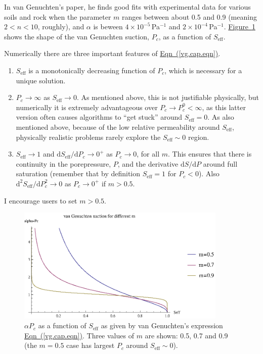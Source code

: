 \documentclass[12pt]{report}
\begin{document}
In van Genuchten's paper, he finds good fits with experimental data
for various soils and rock when the parameter $m$ ranges between about
0.5 and 0.9 (meaning $2<n<10$, roughly), and $\alpha$ is beween
$4\times 10^{-5}$\,Pa$^{-1}$ and $2\times 10^{-4}$\,Pa$^{-1}$.
\hyperref[van_genuchten_pc.fig]{Figure~\ref*{van_genuchten_pc.fig}}
shows the shape of the van Genuchten suction, $P_{c}$, as a function
of $S_{\mathrm{eff}}$.

Numerically there are three important features of
\hyperref[vg.cap.eqn]{Eqn~(\ref*{vg.cap.eqn})}.
\begin{enumerate}
\item $S_{\mathrm{eff}}$ is a monotonically decreasing function of
  $P_{c}$, which is necessary for a unique solution.
\item $P_{c}\rightarrow \infty$ as $S_{\mathrm{eff}}\rightarrow 0$.  As mentioned
above, this is not justifiable physically, but numerically it is
extremely advantageous over $P_{c}\rightarrow P_{c}^{0}<\infty$, as
this latter version often causes algorithms to ``get stuck'' around
$S_{\mathrm{eff}} = 0$.  As also mentioned above, because of the low
relative permeability around $S_{\mathrm{eff}}$, physically realistic
problems rarely explore the $S_{\mathrm{eff}}\sim 0$ region.
\item $S_{\mathrm{eff}}\rightarrow 1$ and
  $\mathrm{d}S_{\mathrm{eff}}/\mathrm{d}P_{c} \rightarrow 0^{+}$ as
  $P_{c}\rightarrow 0$, for all $m$.  This ensures that there is
  continuity in the porepressure, $P$, and the derivative
  $\mathrm{d}S/\mathrm{d}P$ around full saturation (remember that by definition
  $S_{\mathrm{eff}}=1$ for $P_{c}<0$).  Also
  $\mathrm{d}^{2}S_{\mathrm{eff}}/\mathrm{d}P_{c}^{2} \rightarrow 0$
  as $P_{c}\rightarrow 0^{+}$ if $m>0.5$.
\end{enumerate}
I encourage users to set $m>0.5$.

\begin{figure}[htb]
\centering
\includegraphics[width=10cm]{van_genuchten_pc.eps}
\caption{$\alpha P_{c}$ as a function of $S_{\mathrm{eff}}$ as given
  by van Genuchten's expression
  \hyperref[vg.cap.eqn]{Eqn~(\ref*{vg.cap.eqn})}.  Three values of $m$
  are shown: 0.5, 0.7 and 0.9 (the $m=0.5$ case has largest $P_{c}$
  around $S_{\mathrm{eff}}\sim 0$).}
\label{van_genuchten_pc.fig}
\end{figure}
\end{document}
